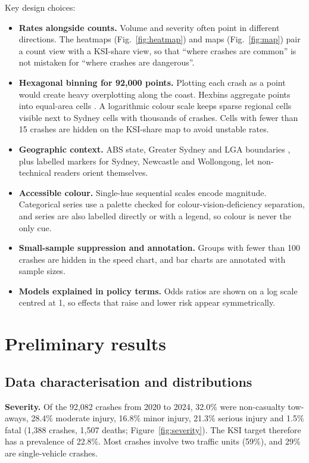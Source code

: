 \documentclass[11pt,a4paper]{article}
\begin{document}
Key design choices:
\begin{itemize}
  \item \textbf{Rates alongside counts.} Volume and severity often point in different directions. The heatmaps
        (Fig.~\ref{fig:heatmap}) and maps (Fig.~\ref{fig:map}) pair a count view with a KSI-share view, so that
        \enquote{where crashes are common} is not mistaken for \enquote{where crashes are dangerous}.
  \item \textbf{Hexagonal binning for 92,000 points.} Plotting each crash as a point would create heavy overplotting
        along the coast. Hexbins aggregate points into equal-area cells \parencite{carr1987}. A logarithmic
        colour scale keeps sparse regional cells visible next to Sydney cells with thousands of crashes. Cells
        with fewer than 15 crashes are hidden on the KSI-share map to avoid unstable rates.
  \item \textbf{Geographic context.} ABS state, Greater Sydney and LGA boundaries \parencite{abs_asgs}, plus labelled
        markers for Sydney, Newcastle and Wollongong, let non-technical readers orient themselves.
  \item \textbf{Accessible colour.} Single-hue sequential scales encode magnitude. Categorical series use a
        palette checked for colour-vision-deficiency separation, and series are also labelled directly or with a
        legend, so colour is never the only cue.
  \item \textbf{Small-sample suppression and annotation.} Groups with fewer than 100 crashes are hidden in the
        speed chart, and bar charts are annotated with sample sizes.
  \item \textbf{Models explained in policy terms.} Odds ratios are shown on a log scale centred at 1, so effects
        that raise and lower risk appear symmetrically.
\end{itemize}

\section{Preliminary results}
\label{sec:prelim}

\subsection{Data characterisation and distributions}

\textbf{Severity.} Of the 92,082 crashes from 2020 to 2024, 32.0\% were non-casualty tow-aways, 28.4\% moderate
injury, 16.8\% minor injury, 21.3\% serious injury and 1.5\% fatal (1,388 crashes, 1,507 deaths;
Figure~\ref{fig:severity}). The KSI target therefore has a prevalence of 22.8\%. Most crashes involve two
traffic units (59\%), and 29\% are single-vehicle crashes.
\end{document}
